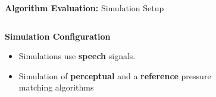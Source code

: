 \documentclass[aspectratio=169]{beamer}
\begin{document}
\begin{frame}{\textbf{Algorithm Evaluation:} Simulation Setup}
    \begin{columns}[c]
        \begin{block}{\textbf{Simulation Configuration}}
            \begin{itemize}
                \item Simulations use \textbf{speech} signals. 
                \vspace{3pt}
                \item Simulation of \textbf{perceptual} and a \textbf{reference} pressure matching algorithms 
                \vspace{3pt}
            \end{itemize}
        \end{block}
        \begin{figure}[]
            \centering
            \scalebox{0.9}{}
        \end{figure}
    \end{columns}
\end{frame}
\end{document}
